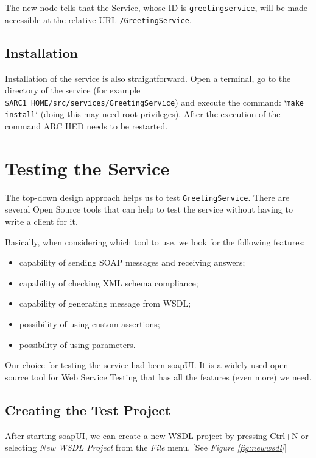 \documentclass{article}
\begin{document}
The new node tells that the Service, whose ID is
\verb#greetingservice#, will be made accessible at the relative URL
\verb#/GreetingService#.

\subsection{Installation}

Installation of the service is also straightforward. Open a terminal, go to
the directory of the service (for example
\verb#$ARC1_HOME/src/services/GreetingService#) and execute the
command: `\verb#make install#` (doing this may need root privileges).
After the execution of the command ARC HED needs to be restarted.

\newpage

\section{Testing the Service}

The top-down design approach helps us to test
\verb#GreetingService#. There are several Open Source tools that can help
to test the service without having to write a client for it.

Basically, when considering which tool to use, we look for the
following features:

\begin{itemize}
  \item{capability of sending SOAP messages and receiving answers;}
  \item{capability of checking XML schema compliance;}
  \item{capability of generating message from WSDL;}
  \item{possibility of using custom assertions;}
  \item{possibility of using parameters.}
\end{itemize}

Our choice for testing the service had been soapUI. It is a widely used open
source tool for Web Service Testing that has all the features (even
more) we need.

\subsection{Creating the Test Project}
\label{sec:createtp}

After starting soapUI, we can create a new WSDL project by pressing
Ctrl+N or selecting \textit{New WSDL Project} from the \textit{File}
menu. [See \emph{Figure \ref{fig:newwsdl}}]
\end{document}
